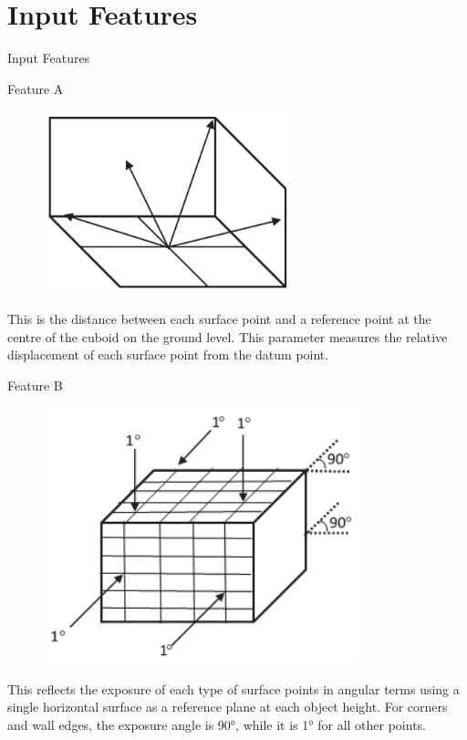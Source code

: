\documentclass{beamer}
\begin{document}
\section{Input Features}
\begin{frame}{Input Features}
    \begin{block}{Feature A}
    \justifying
        \begin{figure}
            \centering\vspace{-5mm}
            \includegraphics[width=0.26\columnwidth]{Figures/Feature_A.png}
            \label{Feature_A}
        \end{figure}
        \vspace{1mm}This is the distance between each surface point and a reference point at the centre of the cuboid on the ground level. This parameter measures the relative displacement of each surface point from the datum point.
    \end{block}
    \begin{block}{Feature B}
    \justifying
        \begin{figure}
            \centering\vspace{-6mm}
            \includegraphics[width=0.28\columnwidth]{Figures/Feature_B.png}
            \label{Feature_B}
        \end{figure}
         \vspace{2mm}This reflects the exposure of each type of surface points in angular terms using a single horizontal surface as a reference plane at each object height. For corners and wall edges, the exposure angle is 90°, while it is 1° for all other points.\vspace{3mm}
    \end{block}
\end{frame}
\end{document}
